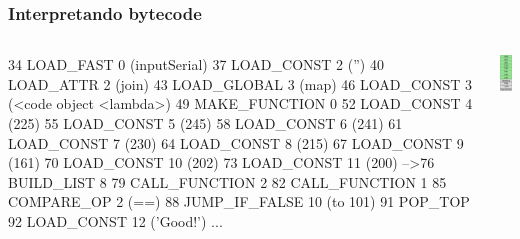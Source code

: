 \documentclass[9pt, notes=hide]{beamer}
\begin{document}
\begin{frame}[fragile]
    \frametitle{Interpretando bytecode}
        \begin{columns}[T]
            \begin{column}{.8\textwidth}
\begin{python}
   34  LOAD_FAST          0 (inputSerial)
   37  LOAD_CONST         2 ('')
   40  LOAD_ATTR          2 (join)
   43  LOAD_GLOBAL        3 (map)
   46  LOAD_CONST         3 (<code object <lambda>)
   49  MAKE_FUNCTION      0
   52  LOAD_CONST         4 (225)
   55  LOAD_CONST         5 (245)
   58  LOAD_CONST         6 (241)
   61  LOAD_CONST         7 (230)
   64  LOAD_CONST         8 (215)
   67  LOAD_CONST         9 (161)
   70  LOAD_CONST        10 (202)
   73  LOAD_CONST        11 (200)
-->76  BUILD_LIST         8
   79  CALL_FUNCTION      2
   82  CALL_FUNCTION      1
   85  COMPARE_OP         2 (==)
   88  JUMP_IF_FALSE     10 (to 101)
   91  POP_TOP
   92  LOAD_CONST        12 ('Good!')
   ...
\end{python}

            \end{column}
            \begin{column}{.3\textwidth}
                \includegraphics[width=2.5cm]{images/stack-1.png}
            \end{column}
        \end{columns}

\end{frame}
\end{document}
